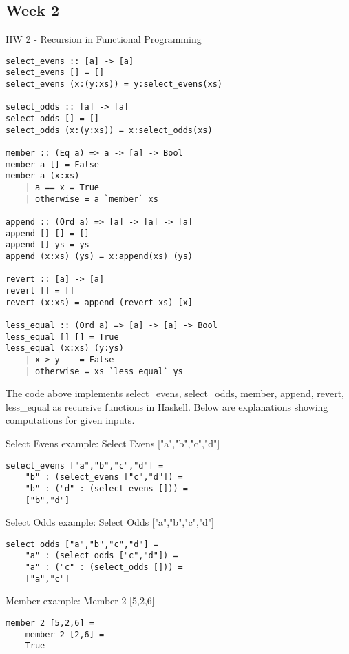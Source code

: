 \documentclass{article}
\theoremstyle{theorem}
\theoremstyle{definition}
\theoremstyle{remark}
\begin{document}
\subsection{Week 2}

HW 2 - Recursion in Functional Programming

\begin{lstlisting}
select_evens :: [a] -> [a]
select_evens [] = []
select_evens (x:(y:xs)) = y:select_evens(xs)

select_odds :: [a] -> [a]
select_odds [] = []
select_odds (x:(y:xs)) = x:select_odds(xs)

member :: (Eq a) => a -> [a] -> Bool
member a [] = False
member a (x:xs)
    | a == x = True
    | otherwise = a `member` xs

append :: (Ord a) => [a] -> [a] -> [a]
append [] [] = []
append [] ys = ys
append (x:xs) (ys) = x:append(xs) (ys)

revert :: [a] -> [a]
revert [] = []
revert (x:xs) = append (revert xs) [x]

less_equal :: (Ord a) => [a] -> [a] -> Bool
less_equal [] [] = True
less_equal (x:xs) (y:ys)
    | x > y    = False
    | otherwise = xs `less_equal` ys
\end{lstlisting}
%

\noindent The code above implements select\_evens, select\_odds, member, append, revert, less\_equal as recursive functions in Haskell. Below are explanations showing computations for given inputs. \newline

\noindent
Select Evens example: 
\newline\newline\indent
Select Evens ["a","b","c","d"]
\begin{lstlisting}
select_evens ["a","b","c","d"] = 
    "b" : (select_evens ["c","d"]) =
    "b" : ("d" : (select_evens [])) =
    ["b","d"]
\end{lstlisting}
%

\noindent
Select Odds example: 
\newline\newline\indent
Select Odds ["a","b","c","d"]
\begin{lstlisting}
select_odds ["a","b","c","d"] = 
    "a" : (select_odds ["c","d"]) =
    "a" : ("c" : (select_odds [])) =
    ["a","c"]
\end{lstlisting}
%

\noindent
Member example: 
\newline\newline\indent
Member 2 [5,2,6]
\begin{lstlisting}
member 2 [5,2,6] = 
    member 2 [2,6] =
    True
\end{lstlisting}
%
\end{document}
